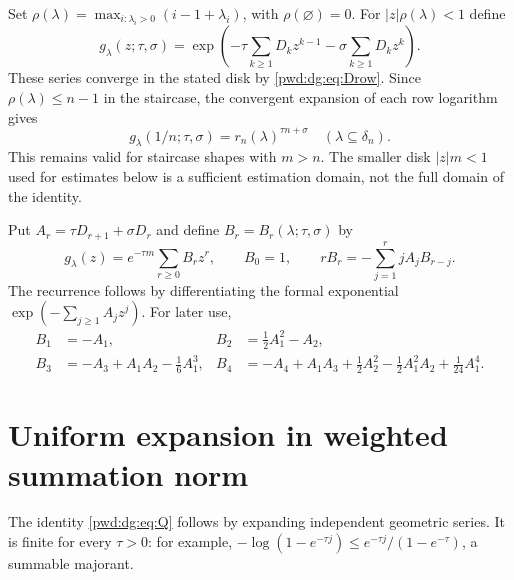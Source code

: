 \documentclass[11pt,letterpaper]{article}
\numberwithin{equation}{section}
\theoremstyle{remark}\newtheorem{remark}[theorem]{Remark}
\begin{document}
Set $\rho(\lambda)=\max_{i:\lambda_i>0}(i-1+\lambda_i)$, with $\rho(\varnothing)=0$. For $|z|\rho(\lambda)<1$ define
\begin{equation}\label{pwd:dg:eq:g}
 g_\lambda(z;\tau,\sigma)=
 \exp\left(-\tau\sum_{k\ge1}D_k z^{k-1}-\sigma\sum_{k\ge1}D_k z^k\right).
\end{equation}
These series converge in the stated disk by \eqref{pwd:dg:eq:Drow}. Since $\rho(\lambda)\le n-1$ in the staircase, the convergent expansion of each row logarithm gives
\begin{equation}\label{pwd:dg:eq:gphysical}
 g_\lambda(1/n;\tau,\sigma)=r_n(\lambda)^{\tau n+\sigma}
 \quad (\lambda\subseteq\delta_n).
\end{equation}
This remains valid for staircase shapes with $m>n$. The smaller disk $|z|m<1$ used for estimates below is a sufficient estimation domain, not the full domain of the identity.

Put $A_r=\tau D_{r+1}+\sigma D_r$ and define $B_r=B_r(\lambda;\tau,\sigma)$ by
\begin{equation}\label{pwd:dg:eq:Bdef}
 g_\lambda(z)=e^{-\tau m}\sum_{r\ge0}B_rz^r,
 \qquad B_0=1,\qquad rB_r=-\sum_{j=1}^rjA_jB_{r-j}.
\end{equation}
The recurrence follows by differentiating the formal exponential $\exp(-\sum_{j\ge1}A_jz^j)$. For later use,
\begin{align}
 B_1&=-A_1,& B_2&=\tfrac12A_1^2-A_2,\nonumber\\
 B_3&=-A_3+A_1A_2-\tfrac16A_1^3,&
 B_4&=-A_4+A_1A_3+\tfrac12A_2^2-\tfrac12A_1^2A_2+\tfrac1{24}A_1^4.\label{pwd:dg:eq:firstB}
\end{align}

\section{Uniform expansion in weighted summation norm}\label{pwd:dg:sec:uniform}
The identity \eqref{pwd:dg:eq:Q} follows by expanding independent geometric series. It is finite for every $\tau>0$: for example, $-\log(1-e^{-\tau j})\le e^{-\tau j}/(1-e^{-\tau})$, a summable majorant.
\end{document}
